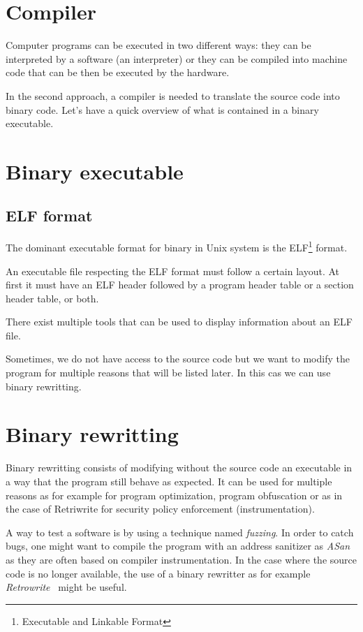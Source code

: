 \documentclass[a4paper,11pt,oneside]{report}
\begin{document}
\section{Compiler}
Computer programs can be executed in two different ways: they can be interpreted
by a software (an interpreter) or they can be compiled into machine code that can
be then be executed by the hardware.

In the second approach, a compiler is needed to translate the source code into binary code.
Let's have a quick overview of what is contained in a binary executable.

\section{Binary executable}
\subsection{ELF format}
%
The dominant executable format for binary in Unix system is the ELF\footnote{Executable
and Linkable Format} format. 

An executable file respecting the ELF format must follow a certain layout. At
first it must have an ELF header followed by a program header table or a section
header table, or both. 

There exist multiple tools that can be used to display information about an ELF file. 

Sometimes, we do not have access to the source code but we want to modify the
program for multiple reasons that will be listed later. In this cas we can use
binary rewritting.

\section{Binary rewritting}
Binary rewritting consists of modifying without the source code an executable
in a way that the program still behave as expected. It can be used for multiple
reasons as for example for program optimization, program obfuscation or as in
the case of Retriwrite for security policy enforcement (instrumentation). 

A way to test a software is by using a technique named \textit{fuzzing}. In
order to catch bugs, one might want to compile the program with an address
sanitizer as \textit{ASan}~\cite{ASan} as they are often based on compiler instrumentation.
In the case where the source code is no longer available, the use of a binary
rewritter as for example \textit{Retrowrite}~\cite{dinesh20oakland} might be useful.
\end{document}
